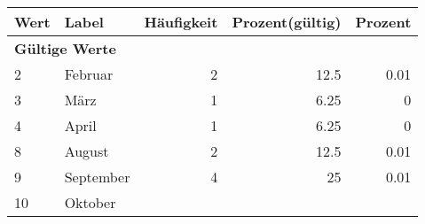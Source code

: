      \begin{longtable}{lXrrr}
     \toprule
     \textbf{Wert} & \textbf{Label} & \textbf{Häufigkeit} & \textbf{Prozent(gültig)} & \textbf{Prozent} \\
     \endhead
     \midrule
     \multicolumn{5}{l}{\textbf{Gültige Werte}}\\

     2 &
     \multicolumn{1}{X}{ Februar   } &


       \num{2} &
       \num[round-mode=places,round-precision=2]{12,5} &
         \num[round-mode=places,round-precision=2]{0,01} \\

     3 &
     \multicolumn{1}{X}{ März   } &


       \num{1} &
       \num[round-mode=places,round-precision=2]{6,25} &
         \num[round-mode=places,round-precision=2]{0} \\

     4 &
     \multicolumn{1}{X}{ April   } &


       \num{1} &
       \num[round-mode=places,round-precision=2]{6,25} &
         \num[round-mode=places,round-precision=2]{0} \\

     8 &
     \multicolumn{1}{X}{ August   } &


       \num{2} &
       \num[round-mode=places,round-precision=2]{12,5} &
         \num[round-mode=places,round-precision=2]{0,01} \\

     9 &
     \multicolumn{1}{X}{ September   } &


       \num{4} &
       \num[round-mode=places,round-precision=2]{25} &
         \num[round-mode=places,round-precision=2]{0,01} \\

     10 &
     \multicolumn{1}{X}{ Oktober   } &



\end{longtable}
